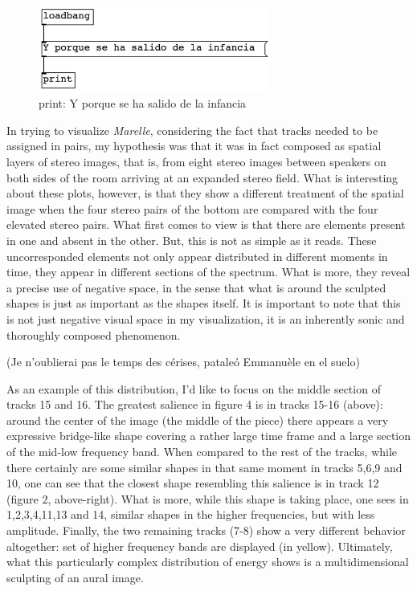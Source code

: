 \documentclass{article}
\begin{document}
\newpage





\begin{center}
\begin{figure}

\includegraphics[width=3in]{foryoungears-img003.jpg}
\caption{print: Y porque se ha salido de la infancia}
\end{figure}
\end{center}
In trying to visualize \textit{Marelle}, considering the fact that tracks needed to be assigned in pairs, my hypothesis was that it was in fact composed as spatial layers of stereo images, that is, from eight stereo images between speakers on both sides of the room arriving at an expanded stereo field. What is interesting about these plots, however, is that they show a different treatment of the spatial image when the four stereo pairs of the bottom are compared with the four elevated stereo pairs. What first comes to view is that there are elements present in one and absent in the other. But, this is not as simple as it reads. These uncorresponded elements not only appear distributed in different moments in time, they appear in different sections of the spectrum. What is more, they reveal a precise use of negative space, in the sense that what is around the sculpted shapes is just as important as the shapes itself. It is important to note that this is not just negative visual space in my visualization, it is an inherently sonic and thoroughly composed phenomenon.


\bigskip
\begin{flushright}
(Je n'oublierai pas le temps des c\'{e}rises, patale\'{o} Emmanu\`{e}le en el suelo) 
\end{flushright}


\bigskip

As an example of this distribution, I'd like to focus on the middle section of tracks 15 and 16. The greatest salience in figure 4 is in tracks 15-16 (above): around the center of the image (the middle of the piece) there appears a very expressive bridge-like shape covering a rather large time frame and a large section of the mid-low frequency band. When compared to the rest of the tracks, while there certainly are some similar shapes in that same moment in tracks 5,6,9 and 10, one can see that the closest shape resembling this salience is in track 12 (figure 2, above-right). What is more, while this shape is taking place, one sees in 1,2,3,4,11,13 and 14, similar shapes in the higher frequencies, but with less amplitude. Finally, the two remaining tracks (7-8) show a very different behavior altogether: set of higher frequency bands are displayed (in yellow). Ultimately, what this particularly complex distribution of energy shows is a multidimensional sculpting of an aural image.
\end{document}
